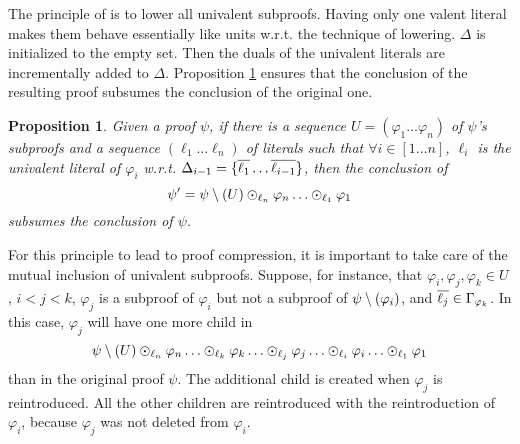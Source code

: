 \documentclass{easychair}
\newtheorem{proposition}{Proposition}
\begin{document}
The principle of {\LowerUnivalents} is to lower all univalent subproofs. Having only one valent literal makes them behave essentially like units w.r.t. the technique of lowering. $\Delta$ is
initialized to the empty set. Then the duals of the univalent literals are incrementally added to
$\Delta$. Proposition \ref{prop:LUniv} ensures that the conclusion of the resulting proof
subsumes the conclusion of the original one.

\begin{proposition} \label{prop:LUniv}
Given a proof $\psi$, if 
there is a sequence $U = (\varphi_1 \ldots \varphi_n)$
of $\psi$'s subproofs and a sequence $(\ell_1 \ldots \ell_n)$ of literals such that $\forall i \in
[1 \ldots n]$, $\ell_i$ is the univalent literal of $\varphi_i$ w.r.t. $\Delta_{i-1} =
\{\overline{\ell_1} \ldots \overline{\ell_{i-1}}\}$, then the conclusion of $$ \psi' = \psi \setminus (U)
\odot_{\ell_n} \varphi_n \ldots \odot_{\ell_1} \varphi_1 $$ subsumes the conclusion of $\psi$.
\end{proposition}


For this principle to lead to proof compression, it is important to take care
of the mutual inclusion of univalent subproofs.
Suppose, for instance, that $\varphi_i, \varphi_j, \varphi_k \in U$, $i < j < k$, $\varphi_j$ is a
subproof of $\varphi_i$ but not a subproof of $\psi \setminus (\varphi_i)$, and $\overline{\ell_j} \in
\Gamma_{\varphi_k}$.  In this case, $\varphi_j$ will have one more child in
$$
\psi \setminus (U) \odot_{\ell_n} \varphi_n \ldots \odot_{\ell_k} \varphi_k \ldots \odot_{\ell_j} \varphi_j \ldots \odot_{\ell_i} \varphi_i \ldots \odot_{\ell_1} \varphi_1
$$
than in the original proof $\psi$. The additional child is created when $\varphi_j$ is reintroduced.
All the other children are reintroduced with the reintroduction of $\varphi_i$, because
$\varphi_j$ was not deleted from $\varphi_i$.
\end{document}

